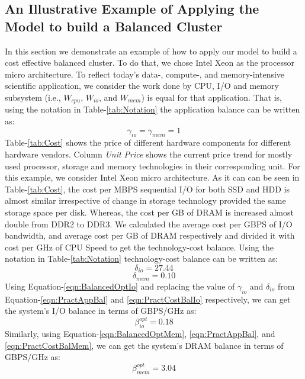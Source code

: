 \documentclass[journal]{IEEEtran}
\begin{document}
\subsection{An Illustrative Example of Applying the Model to build a Balanced Cluster}
In this section we demonstrate an example of how to apply our model to build a cost effective balanced cluster. To do that, we chose Intel Xeon as the processor micro architecture. To reflect today's data-, compute-, and memory-intensive scientific application, we consider the work done by CPU, I/O and memory subsystem (i.e., $W_{cpu}$, $W_{io}$, and $W_{mem}$) is equal for that application. That is, using the notation in Table-\ref{tab:Notation} the application balance  can be written as:
\begin{equation} \label{eqn:PractAppBal}
\gamma_{io} = \gamma_{mem} = 1
\end{equation}
Table-\ref{tab:Cost} shows the price of different hardware components for different hardware vendors. Column \textit{Unit Price} shows the current price trend  for mostly used processor, storage and memory technologies in their corresponding unit. For this example, we consider Intel Xeon micro architecture. As it can can be seen in  Table-\ref{tab:Cost}, the cost per MBPS sequential I/O for both SSD and HDD is almost similar irrespective of change in storage technology provided the same storage space per disk. Whereas, the cost per GB of DRAM is increased almost double from DDR2 to DDR3. We calculated the average cost per GBPS of I/O bandwidth, and average cost per GB of DRAM respectively and divided it with cost per GHz of CPU Speed to get the technology-cost balance. Using the notation in Table-\ref{tab:Notation} technology-cost balance can be written as: 
\begin{equation} \label{eqn:PractCostBalIo}
\delta_{io} = 27.44 
\end{equation}
\begin{equation} \label{eqn:PractCostBalMem}
\delta_{mem} = 0.10
\end{equation}
Using Equation-\ref{eqn:BalancedOptIo} and replacing the value of $\gamma_{io}$ and $\delta_{io}$ from Equation-\ref{eqn:PractAppBal} and \ref{eqn:PractCostBalIo} respectively, we can get the system's I/O balance in terms of GBPS/GHz as:
\begin{equation} \label{eqn:PractSysBalIo}
\beta_{io}^{opt} = 0.18
\end{equation}
Similarly, using Equation-\ref{eqn:BalancedOptMem}, \ref{eqn:PractAppBal}, and \ref{eqn:PractCostBalMem}, we can get the system's DRAM balance in terms of GBPS/GHz as:
\begin{equation} \label{eqn:PractSysBalMem}
\beta_{mem}^{opt} = 3.04
\end{equation} 
\end{document}
